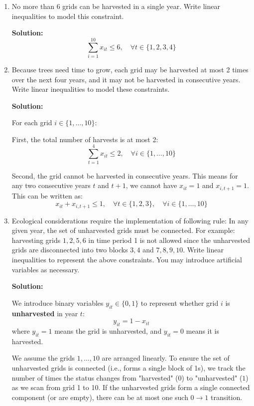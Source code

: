 \documentclass{article}
\begin{document}
\begin{enumerate}
\begin{enumerate}
\textbf{Solution:}
\[
\max \sum_{t=1}^{4} \sum_{i=1}^{10} p_{it} x_{it}
\]

\item No more than 6 grids can be harvested in a single year.  Write  linear inequalities to model this constraint.

\textbf{Solution:}
\[
\sum_{i=1}^{10} x_{it} \leq 6, \quad \forall t \in \{1, 2, 3, 4\}
\]

\item  Because trees need time to grow, each grid may be harvested at most 2 times over the next four years, and it may not be harvested in consecutive years. Write linear inequalities to model these constraints.

\textbf{Solution:}

For each grid $i \in \{1, \ldots, 10\}$:

First, the total number of harvests is at most 2:
\[
\sum_{t=1}^{4} x_{it} \leq 2, \quad \forall i \in \{1, \ldots, 10\}
\]

Second, the grid cannot be harvested in consecutive years. This means for any two consecutive years $t$ and $t+1$, we cannot have $x_{it} = 1$ and $x_{i,t+1} = 1$. This can be written as:
\[
x_{it} + x_{i,t+1} \leq 1, \quad \forall t \in \{1, 2, 3\}, \quad \forall i \in \{1, \ldots, 10\}
\]

\item  Ecological considerations require the implementation of following rule: In any given year, the set of unharvested grids must be connected. For example: harvesting grids $1, 2, 5, 6$ in time period 1 is not allowed since the unharvested grids are disconnected into two blocks $3, 4$ and $7,8,9,10$. Write linear inequalities to represent the above constraints. You may introduce artificial variables as necessary. 

\textbf{Solution:}

We introduce binary variables $y_{it} \in \{0,1\}$ to represent whether grid $i$ is \textbf{unharvested} in year $t$:
\[
y_{it} = 1 - x_{it}
\]
where $y_{it} = 1$ means the grid is unharvested, and $y_{it} = 0$ means it is harvested.

We assume the grids $1, \ldots, 10$ are arranged linearly. To ensure the set of unharvested grids is connected (i.e., forms a single block of 1s), we track the number of times the status changes from "harvested" ($0$) to "unharvested" ($1$) as we scan from grid 1 to 10. If the unharvested grids form a single connected component (or are empty), there can be at most one such $0 \to 1$ transition.


\end{enumerate}
\end{enumerate}
\end{document}
